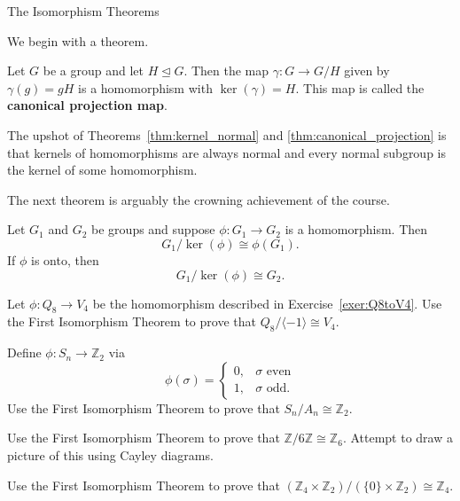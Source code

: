 \begin{section}{The Isomorphism Theorems}

We begin with a theorem.

\begin{theorem}\label{thm:canonical_projection}
Let $G$ be a group and let $H\trianglelefteq G$.  Then the map $\gamma:G\to G/H$ given by $\gamma(g)=gH$ is a homomorphism with $\ker(\gamma)=H$. This map is called the \textbf{canonical projection map}.
\end{theorem}

The upshot of Theorems~\ref{thm:kernel_normal} and \ref{thm:canonical_projection} is that kernels of homomorphisms are always normal and every normal subgroup is the kernel of some homomorphism.

The next theorem is arguably the crowning achievement of the course.

\begin{theorem}
Let $G_1$ and $G_2$ be groups and suppose $\phi:G_1\to G_2$ is a homomorphism. Then
\[
G_1/\ker(\phi)\cong \phi(G_1).
\]
If $\phi$ is onto, then
\[
G_1/\ker(\phi)\cong G_2.
\]
\end{theorem}

\begin{exercise}
Let $\phi:Q_8\to V_4$ be the homomorphism described in Exercise~\ref{exer:Q8toV4}. Use the First Isomorphism Theorem to prove that $Q_8/\langle-1\rangle\cong V_4$.
\end{exercise}

\begin{exercise}
Define $\phi:S_n\to \mathbb{Z}_2$ via
\[
\phi(\sigma)=\begin{cases}
0, & \sigma \text{ even}\\
1, & \sigma \text{ odd}.
\end{cases}
\]
Use the First Isomorphism Theorem to prove that $S_n/A_n\cong \mathbb{Z}_2$.
\end{exercise}

\begin{exercise}
Use the First Isomorphism Theorem to prove that $\mathbb{Z}/6\mathbb{Z}\cong \mathbb{Z}_6$.  Attempt to draw a picture of this using Cayley diagrams.
\end{exercise}

\begin{exercise}
Use the First Isomorphism Theorem to prove that $(\mathbb{Z}_4\times \mathbb{Z}_2)/(\{0\}\times \mathbb{Z}_2)\cong \mathbb{Z}_4$.
\end{exercise}


\end{section}
